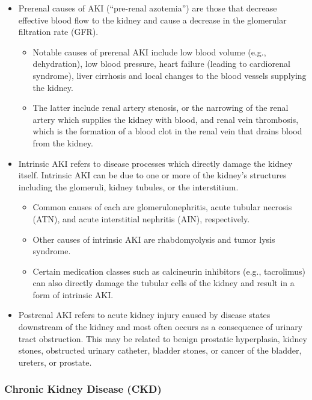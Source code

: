 \documentclass[11pt]{article}
\begin{document}
\begin{itemize}
    \item Prerenal causes of AKI (``pre-renal azotemia'') are those that decrease effective blood flow to the kidney and cause a decrease in the glomerular filtration rate (GFR).
        \begin{itemize}
            \item Notable causes of prerenal AKI include low blood volume (e.g., dehydration), low blood pressure, heart failure (leading to cardiorenal syndrome), liver cirrhosis and local changes to the blood vessels supplying the kidney. 
            \item The latter include renal artery stenosis, or the narrowing of the renal artery which supplies the kidney with blood, and renal vein thrombosis, which is the formation of a blood clot in the renal vein that drains blood from the kidney.
        \end{itemize}
    \item Intrinsic AKI refers to disease processes which directly damage the kidney itself. Intrinsic AKI can be due to one or more of the kidney's structures including the glomeruli, kidney tubules, or the interstitium. 
        \begin{itemize}
            \item Common causes of each are glomerulonephritis, acute tubular necrosis (ATN), and acute interstitial nephritis (AIN), respectively. 
            \item Other causes of intrinsic AKI are rhabdomyolysis and tumor lysis syndrome.
            \item Certain medication classes such as calcineurin inhibitors (e.g., tacrolimus) can also directly damage the tubular cells of the kidney and result in a form of intrinsic AKI.
        \end{itemize}
    \item Postrenal AKI refers to acute kidney injury caused by disease states downstream of the kidney and most often occurs as a consequence of urinary tract obstruction. This may be related to benign prostatic hyperplasia, kidney stones, obstructed urinary catheter, bladder stones, or cancer of the bladder, ureters, or prostate.
\end{itemize}

\subsubsection{Chronic Kidney Disease (CKD)}
\end{document}
